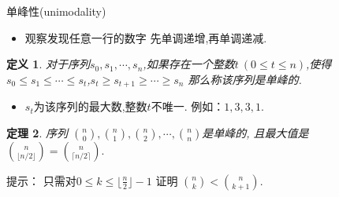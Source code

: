 \documentclass[punct]{ctexbeamer}
\newtheorem{thm}{定理}[section]
\newtheorem{defi}[thm]{定义}
\begin{document}
\begin{frame}{单峰性(unimodality)	}
    	\begin{itemize}
        \item 观察发现任意一行的数字 先单调递增,再单调递减.
    \end{itemize}

    \begin{defi}
        对于序列$s_{0}, s_{1}, \cdots, s_{n}$,如果存在一个整数$t\ (0 \leq t \leq n)$,使得
        $s_{0} \leq s_{1} \leq \cdots \leq s_{t}$,$s_{t}\geq s_{t+1}\geq \cdots \geq s_{n}$
        那么称该序列是单峰的.
    \end{defi}
    \begin{itemize}
        \item  $s_{t}$为该序列的最大数,整数$t$不唯一.
         例如：$1, 3, 3, 1$.
    \end{itemize}
	\begin{thm}
	序列	$\binom{n}{0},\binom{n}{1},\binom{n}{2},\cdots,\binom{n}{n}$是单峰的,
		且最大值是$\binom{n}{\lfloor n/2 \rfloor}=\binom{n}{\lceil n/2 \rceil}.$
	\end{thm}
\pause
提示： 只需对$0\le k \le {\lfloor \frac{n}{2} \rfloor}-1$ 证明
$\binom{n}{k} < \binom{n}{k+1}$.

\end{frame}
\end{document}
